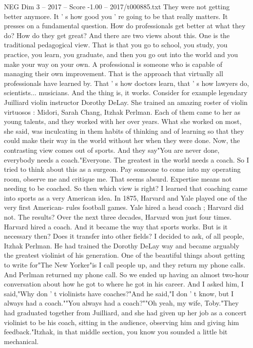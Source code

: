 \begin{textsample}{NEG Dim 3 – 2017 – Score -1.00 – 2017/t000885.txt}
They were not getting better anymore.
It ' s how good you ' re going to be that really matters.
It presses on a fundamental question.
How do professionals get better at what they do?
How do they get great?
And there are two views about this.
One is the traditional pedagogical view.
That is that you go to school, you study, you practice, you learn, you graduate, and then you go out into the world and you make your way on your own.
A professional is someone who is capable of managing their own improvement.
That is the approach that virtually all professionals have learned by.
That ' s how doctors learn, that ' s how lawyers do, scientists... musicians.
And the thing is, it works.
Consider for example legendary Juilliard violin instructor Dorothy DeLay.
She trained an amazing roster of violin virtuosos : Midori, Sarah Chang, Itzhak Perlman.
Each of them came to her as young talents, and they worked with her over years.
What she worked on most, she said, was inculcating in them habits of thinking and of learning so that they could make their way in the world without her when they were done.
Now, the contrasting view comes out of sports.
And they say"You are never done, everybody needs a coach."Everyone.
The greatest in the world needs a coach.
So I tried to think about this as a surgeon.
Pay someone to come into my operating room, observe me and critique me.
That seems absurd.
Expertise means not needing to be coached.
So then which view is right?
I learned that coaching came into sports as a very American idea.
In 1875, Harvard and Yale played one of the very first American- rules football games.
Yale hired a head coach ; Harvard did not.
The results?
Over the next three decades, Harvard won just four times.
Harvard hired a coach.
And it became the way that sports works.
But is it necessary then?
Does it transfer into other fields?
I decided to ask, of all people, Itzhak Perlman.
He had trained the Dorothy DeLay way and became arguably the greatest violinist of his generation.
One of the beautiful things about getting to write for"The New Yorker"is I call people up, and they return my phone calls.
And Perlman returned my phone call.
So we ended up having an almost two-hour conversation about how he got to where he got in his career.
And I asked him, I said,"Why don ' t violinists have coaches?"And he said,"I don ' t know, but I always had a coach.""You always had a coach?""Oh yeah, my wife, Toby."They had graduated together from Juilliard, and she had given up her job as a concert violinist to be his coach, sitting in the audience, observing him and giving him feedback."Itzhak, in that middle section, you know you sounded a little bit mechanical.

\end{textsample}
